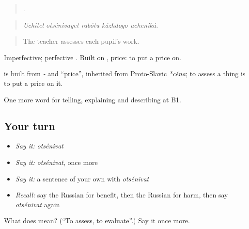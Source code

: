 \begin{quote}
    .
\end{quote}

\begin{quote}
\emph{Uchítel otsénivayet rabótu kázhdogo ucheniká.}
\end{quote}

\begin{quote}
The teacher assesses each pupil’s work.
\end{quote}

Imperfective; perfective \emph{}. Built on \emph{}, price: to put a price on.

\begin{cousinweb}
\textbf{} is built from \emph{-} and \emph{} \textquotedblleft{}price\textquotedblright{}, inherited from Proto-Slavic \emph{*cěna}; to assess a thing is to put a price on it.
\end{cousinweb}

\begin{grammarlens}[title={What you've built}]
One more word for telling, explaining and describing at B1.
\end{grammarlens}

\subsection*{Your turn}
\begin{itemize}
\raggedright
  \item \emph{Say it:} \emph{otsénivat}
  \item \emph{Say it:} \emph{otsénivat}, once more
  \item \emph{Say it:} a sentence of your own with \emph{otsénivat}
  \item \emph{Recall:} say the Russian for benefit, then the Russian for harm, then say \emph{otsénivat} again
\end{itemize}

\begin{tcolorbox}[breakable,colback=teal!4,colframe=teal!35!black,title={Before you move on}]
What does  mean? (\textquotedblleft{}To assess, to evaluate\textquotedblright{}.) Say it once more.
\end{tcolorbox}
